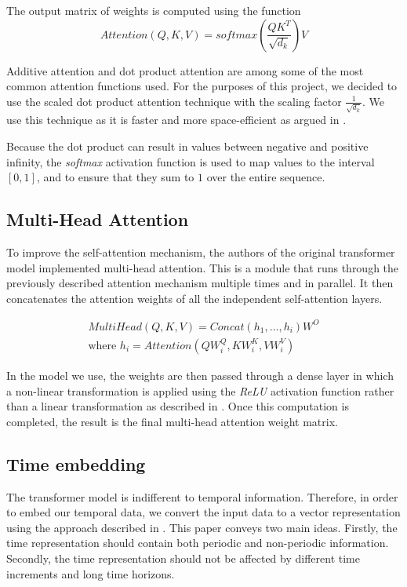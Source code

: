 The output matrix of weights is computed using the function
$$
Attention(Q, K, V) = softmax(\frac{QK^T}{\sqrt{d_k}})V
$$

Additive attention and dot product attention are among some of the most common attention functions used.
For the purposes of this project, we decided to use the scaled dot product attention technique with the scaling factor $\frac{1}{\sqrt{d_k}}$.
We use this technique as it is faster and more space-efficient as argued in \citet{AttentionIsAllYouNeed}.

Because the dot product can result in values between negative and positive infinity, the \textit{softmax} activation function is used to map values to the interval $[0,1]$, and to ensure that they sum to $1$ over the entire sequence. \cite{AttentionIsAllYouNeed}

\subsection{Multi-Head Attention} \label{sec:multi-head attention}
To improve the self-attention mechanism, the authors of the original transformer model implemented multi-head attention.
This is a module that runs through the previously described attention mechanism multiple times and in parallel.
It then concatenates the attention weights of all the independent self-attention layers. 

\begin{align*}
MultiHead(Q, K, V) = Concat(h_1, \ldots, h_i)W^O \\
\text{where }h_i = Attention(QW^Q_i, KW^K_i, VW^V_i) 
\end{align*}

In the model we use, the weights are then passed through a dense layer in which a non-linear transformation is applied using the \textit{ReLU} activation function rather than a linear transformation as described in \citet{AttentionIsAllYouNeed}. 
Once this computation is completed, the result is the final multi-head attention weight matrix. \cite{AttentionIsAllYouNeed}

\subsection{Time embedding}
The transformer model is indifferent to temporal information.
Therefore, in order to embed our temporal data, we convert the input data to a vector representation using the approach described in \citet{time2vec}. 
This paper conveys two main ideas.
Firstly, the time representation should contain both periodic and non-periodic information.
Secondly, the time representation should not be affected by different time increments and long time horizons.  

